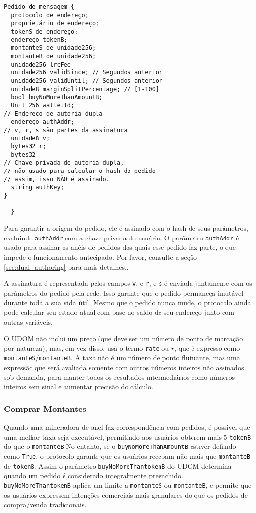 \documentclass[UTF8,nofonts]{article}
\begin{document}
\begin{multicols}{2}
\begin{verbatim}
Pedido de mensagem {
  protocolo de endereço;
  proprietário de endereço;
  tokenS de endereço;
  endereço tokenB;
  montanteS de unidade256;
  montanteB de unidade256;
  unidade256 lrcFee
  unidade256 validSince; // Segundos anterior
  unidade256 validUntil; // Segundos anterior
  unidade8 marginSplitPercentage; // [1-100]
  bool buyNoMoreThanAmountB;
  Unit 256 walletId;
// Endereço de autoria dupla
  endereço authAddr;
// v, r, s são partes da assinatura
  unidade8 v;
  bytes32 r;
  bytes32
// Chave privada de autoria dupla,
// não usado para calcular o hash do pedido
// assim, isso NÃO é assinado.
  string authKey;
}
         
  }
\end{verbatim}


Para garantir a origem do pedido, ele é assinado com o hash de seus parâmetros, excluindo \verb|authAddr|,com a chave privada do usuário. O parâmetro \verb|authAddr| é usado para assinar os anéis de pedidos dos quais esse pedido faz parte, o que impede o funcionamento antecipado. Por favor, consulte a seção \ref{sec:dual_authoring} para mais detalhes..

A assinatura é representada pelos campos \verb|v|, e \verb|r|, e \verb|s| é enviada juntamente com os parâmetros do pedido pela rede. Isso garante que o pedido permaneça imutável durante toda a sua vida útil. Mesmo que o pedido nunca mude, o protocolo ainda pode calcular seu estado atual com base no saldo de seu endereço junto com outras variáveis.



O UDOM não inclui um preço (que deve ser um número de ponto de marcação por natureza), mas, em vez disso, usa o termo \verb|rate| ou $r$, que é expresso como \verb|montanteS|/\verb|montanteB|.  A taxa não é um número de ponto flutuante, mas uma expressão que será avaliada somente com outros números inteiros não assinados sob demanda, para manter todos os resultados intermediários como números inteiros sem sinal e aumentar precisão do cálculo.


\subsubsection{Comprar Montantes}

Quando uma mineradora de anel faz correspondência com pedidos, é possível que uma melhor taxa seja executável, permitindo aos usuários obterem mais 5 \verb|tokenB| do que o \verb|montanteB| No entanto, se o \verb|buyNoMoreThanAmountB| estiver definido como \verb|True|,  o protocolo garante que os usuários recebam não mais que \verb|montanteB| de \verb|tokenB|. Assim o parâmetro \verb|buyNoMoreThantokenB| do UDOM determina quando um pedido é considerado integralmente preenchido. \verb|buyNoMoreThantokenB| aplica um limite a  \verb|montanteS| ou \verb|montanteB|, e permite que os usuários expressem intenções comerciais mais granulares do que os pedidos de compra/venda tradicionais.



\end{multicols}
\end{document}
